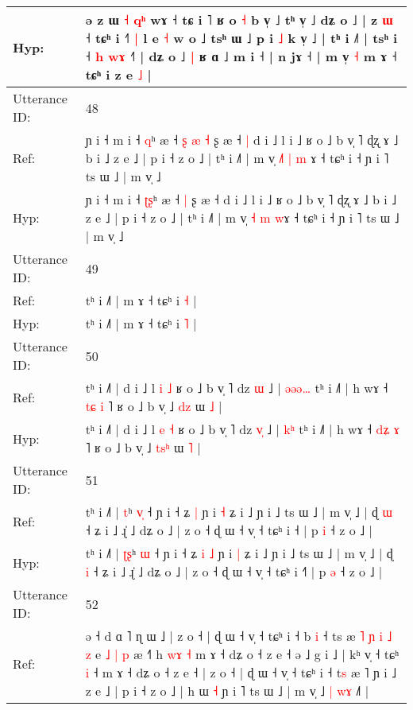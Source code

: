 \documentclass[10pt]{article}
\DeclareRobustCommand{\hl}[1]{{\textcolor{red}{#1}}}
\begin{document}
\begin{longtable}{ll}
 \\
Hyp: & ə\hl{}\hl{} z ɯ \hl{}\hl{˧} \hl{}\hl{q}\hl{ʰ} wɤ ˧ tɕ i ˥ ʁ o \hl{˧} b v̩ ˩ tʰ v̩ ˩ dʑ o ˩ | z \hl{ɯ} ˧ tɕʰ i ˧\hl{˥}\hl{ }\hl{|} l e \hl{˧} w o ˩ tsʰ ɯ ˩\hl{}\hl{} p i \hl{˩} k v̩ ˩ | tʰ i ˩˥ | tsʰ i ˧ \hl{h}\hl{ }\hl{w}\hl{ɤ} ˧˥ | dʑ o ˩\hl{ }\hl{|} ʁ ɑ ˩ m i ˧ | n jɤ ˧ | m v̩\hl{}\hl{}\hl{} \hl{˧} m ɤ ˧ tɕʰ i\hl{}\hl{} z e \hl{˩} |
 \\
\midrule
Utterance ID: & 48 \\
Ref: & ɲ i ˧ m i ˧ \hl{}\hl{q}ʰ æ ˧\hl{ }\hl{ʂ}\hl{ }\hl{æ} \hl{˧} ʂ æ ˧\hl{ }\hl{|} d i ˩ l i ˩ ʁ o ˩ b v̩ ˥ ɖʐ ɤ ˩ b i ˩ z e ˩ | p i ˧ z o ˩ | tʰ i ˩˥ | m v̩ \hl{˩}\hl{˥} \hl{|} \hl{m}\hl{ }ɤ ˧ tɕʰ i ˧ ɲ i ˥ ts ɯ ˩ | m v̩ ˩
 \\
Hyp: & ɲ i ˧ m i ˧ \hl{ʈ}\hl{ʂ}ʰ æ ˧\hl{}\hl{}\hl{}\hl{} \hl{|} ʂ æ ˧\hl{}\hl{} d i ˩ l i ˩ ʁ o ˩ b v̩ ˥ ɖʐ ɤ ˩ b i ˩ z e ˩ | p i ˧ z o ˩ | tʰ i ˩˥ | m v̩ \hl{}\hl{˧} \hl{m} \hl{}\hl{w}ɤ ˧ tɕʰ i ˧ ɲ i ˥ ts ɯ ˩ | m v̩ ˩
 \\
\midrule
Utterance ID: & 49 \\
Ref: & tʰ i ˩˥ | m ɤ ˧ tɕʰ i \hl{˧} |
 \\
Hyp: & tʰ i ˩˥ | m ɤ ˧ tɕʰ i \hl{˥} |
 \\
\midrule
Utterance ID: & 50 \\
Ref: & tʰ i ˩˥ | d i ˩ l \hl{i} \hl{˩} ʁ o ˩ b v̩ ˥ dz \hl{}\hl{ɯ} ˩ | \hl{ə}\hl{ə}\hl{ə}\hl{…} tʰ i ˩˥ | h wɤ ˧ \hl{t}\hl{ɕ} \hl{i} ˥ ʁ o ˩ b v̩ ˩ \hl{}\hl{d}\hl{z} ɯ \hl{˩} |
 \\
Hyp: & tʰ i ˩˥ | d i ˩ l \hl{e} \hl{˧} ʁ o ˩ b v̩ ˥ dz \hl{v}\hl{̩} ˩ | \hl{}\hl{}\hl{k}\hl{ʰ} tʰ i ˩˥ | h wɤ ˧ \hl{d}\hl{ʑ} \hl{ɤ} ˥ ʁ o ˩ b v̩ ˩ \hl{t}\hl{s}\hl{ʰ} ɯ \hl{˥} |
 \\
\midrule
Utterance ID: & 51 \\
Ref: & tʰ i ˩˥ | \hl{}\hl{t}ʰ \hl{v}\hl{̩} ˧ ɲ i ˧ ʑ\hl{}\hl{} \hl{|} ɲ i \hl{˧} ʑ i ˩ ɲ i ˩ ts ɯ ˩ | m v̩ ˩ | ɖ \hl{ɯ} ˧ ʑ i ˩ ɻ̍ ˩ dʑ o ˩ | z o ˧ ɖ ɯ ˧ v̩ ˧ tɕʰ i ˧\hl{} | p \hl{i} ˧ z o ˩ |
 \\
Hyp: & tʰ i ˩˥ | \hl{ʈ}\hl{ʂ}ʰ \hl{}\hl{ɯ} ˧ ɲ i ˧ ʑ\hl{ }\hl{i} \hl{˩} ɲ i \hl{|} ʑ i ˩ ɲ i ˩ ts ɯ ˩ | m v̩ ˩ | ɖ \hl{i} ˧ ʑ i ˩ ɻ̍ ˩ dʑ o ˩ | z o ˧ ɖ ɯ ˧ v̩ ˧ tɕʰ i ˧\hl{˥} | p \hl{ə} ˧ z o ˩ |
 \\
\midrule
Utterance ID: & 52 \\
Ref: & ə ˧ d ɑ ˥ ɳ ɯ ˩ | z o ˧ | ɖ ɯ ˧ v̩ ˧ tɕʰ i ˧\hl{}\hl{}\hl{} b \hl{i} ˧ ts æ \hl{˥} \hl{ɲ} \hl{i} \hl{˩} \hl{z} e \hl{˩} \hl{|}\hl{ }\hl{p} æ ˧\hl{˥} h \hl{}\hl{w}\hl{ɤ} \hl{˧} m ɤ ˧ dʑ o ˧ z e ˧\hl{}\hl{} ə ˩ g i ˩ | kʰ v̩ ˧ tɕʰ \hl{i} ˧\hl{}\hl{} m ɤ ˧ dʑ o ˧ z e ˧ | z o ˧ | ɖ ɯ ˧ v̩ ˧\hl{}\hl{} tɕʰ i ˧ t\hl{s} \hl{}æ ˥ ɲ i ˩ z e ˩ | p i ˧ z o ˩ | h ɯ \hl{˧} ɲ i ˥ ts ɯ ˩ | m v̩ ˩ \hl{|} \hl{w}\hl{ɤ} ˩\hl{˥} |

\end{longtable}
\end{document}

